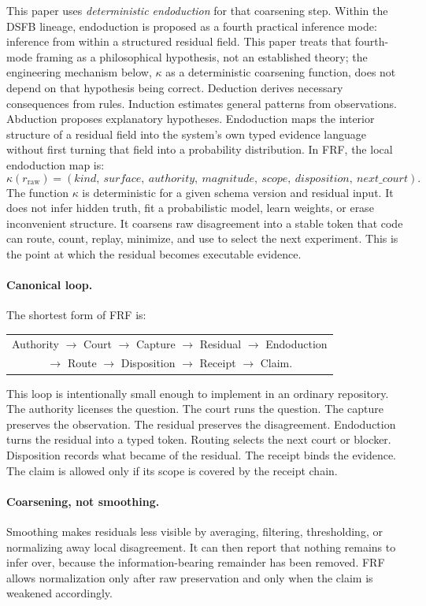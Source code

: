 \documentclass[11pt,a4paper]{article}
\newcommand{\frf}{\textsc{FRF}}
\newcommand{\dsfb}{\textsc{DSFB}}
\begin{document}
This paper uses \emph{deterministic endoduction} for that coarsening step. Within the \dsfb{} lineage, endoduction is proposed as a fourth practical inference mode: inference from within a structured residual field. This paper treats that fourth-mode framing as a philosophical hypothesis, not an established theory; the engineering mechanism below, \(\kappa\) as a deterministic coarsening function, does not depend on that hypothesis being correct. Deduction derives necessary consequences from rules. Induction estimates general patterns from observations. Abduction proposes explanatory hypotheses. Endoduction maps the interior structure of a residual field into the system's own typed evidence language without first turning that field into a probability distribution. In \frf{}, the local endoduction map is:
\[
  \kappa(r_{\text{raw}}) =
  (kind,\ surface,\ authority,\ magnitude,\ scope,\ disposition,\ next\_court).
\]
The function \(\kappa\) is deterministic for a given schema version and residual input. It does not infer hidden truth, fit a probabilistic model, learn weights, or erase inconvenient structure. It coarsens raw disagreement into a stable token that code can route, count, replay, minimize, and use to select the next experiment. This is the point at which the residual becomes executable evidence.

\paragraph{Canonical loop.}
The shortest form of \frf{} is:
\begin{center}
\small
\begin{tabular}{c}
Authority \(\rightarrow\) Court \(\rightarrow\) Capture \(\rightarrow\) Residual \(\rightarrow\) Endoduction\\
\(\rightarrow\) Route \(\rightarrow\) Disposition \(\rightarrow\) Receipt \(\rightarrow\) Claim.
\end{tabular}
\end{center}
This loop is intentionally small enough to implement in an ordinary repository. The authority licenses the question. The court runs the question. The capture preserves the observation. The residual preserves the disagreement. Endoduction turns the residual into a typed token. Routing selects the next court or blocker. Disposition records what became of the residual. The receipt binds the evidence. The claim is allowed only if its scope is covered by the receipt chain.

\paragraph{Coarsening, not smoothing.}
Smoothing makes residuals less visible by averaging, filtering, thresholding, or normalizing away local disagreement. It can then report that nothing remains to infer over, because the information-bearing remainder has been removed. \frf{} allows normalization only after raw preservation and only when the claim is weakened accordingly.
\end{document}

